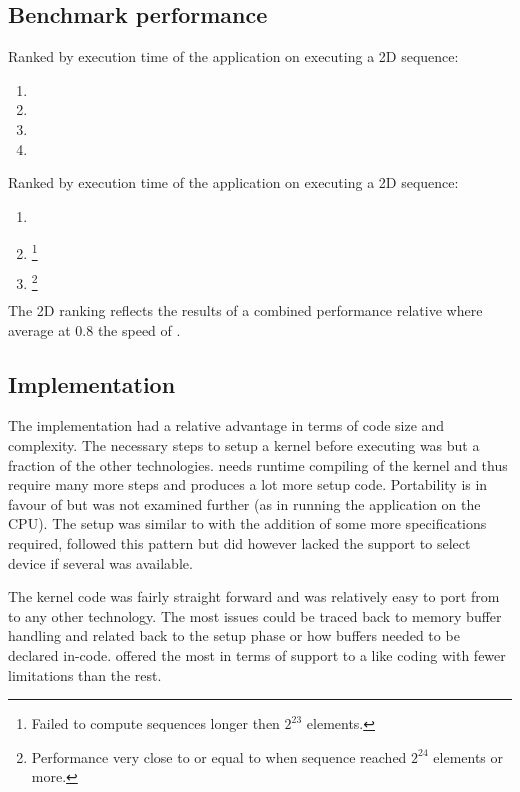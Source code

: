 \subsection{Benchmark performance}

Ranked by execution time of the application on {\NVCARD} executing a \gls{2D} sequence:
\begin{enumerate}	
	\item {\CU}
	\item {\DX}
	\item {\GL}
	\item {\OCL}
\end{enumerate}

Ranked by execution time of the application on {\AMDCARD} executing a \gls{2D} sequence:
\begin{enumerate}	
	\item {\DX}
	\item {\GL}\footnote{Failed to compute sequences longer then $2^{23}$ elements.}
	\item {\OCL}\footnote{Performance very close to or equal to {\DX} when sequence reached $2^{24}$ elements or more.}
\end{enumerate}
The \gls{2D} ranking reflects the results of a combined performance relative {\OCL} where {\DX} average at $0.8$ the speed of {\OCL}.	

\subsection{Implementation}

The {\CU} implementation had a relative advantage in terms of code size and complexity. The necessary steps to setup a kernel before executing was but a fraction of the other technologies. {\OCL} needs runtime compiling of the kernel and thus require many more steps and produces a lot more setup code. Portability is in favour of {\OCL} but was not examined further (as in running the application on the \gls{CPU}). The {\DX} setup was similar to {\OCL} with the addition of some more specifications required, {\GL} followed this pattern but did however lacked the support to select device if several was available.

The kernel code was fairly straight forward and was relatively easy to port from {\CU} to any other technology. The most issues could be traced back to memory buffer handling and related back to the setup phase or how buffers needed to be declared in-code. {\CU} offered the most in terms of support to a {\CPP} like coding with fewer limitations than the rest.

